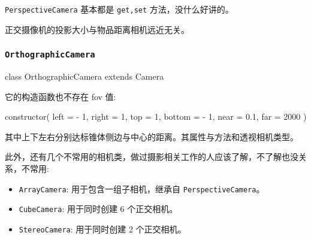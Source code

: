 \texttt{PerspectiveCamera} 基本都是 \texttt{get,set} 方法，没什么好讲的。

正交摄像机的投影大小与物品距离相机远近无关。

\subsubsection*{\texttt{OrthographicCamera}}

\begin{JavaScript}
class OrthographicCamera extends Camera
\end{JavaScript}

它的构造函数也不存在 fov 值:

\begin{JavaScript}
constructor( left = - 1, right = 1, top = 1, bottom = - 1, near = 0.1, far = 2000 )
\end{JavaScript}

其中上下左右分别达标锥体侧边与中心的距离。其属性与方法和透视相机类型。

此外，还有几个不常用的相机类，做过摄影相关工作的人应该了解，不了解也没关系，不常用:
\begin{itemize}
  \item \texttt{ArrayCamera}: 用于包含一组子相机，继承自 \texttt{PerspectiveCamera}。
  \item \texttt{CubeCamera}: 用于同时创建 6 个正交相机。
  \item \texttt{StereoCamera}: 用于同时创建 2 个正交相机。
\end{itemize}

\newpage